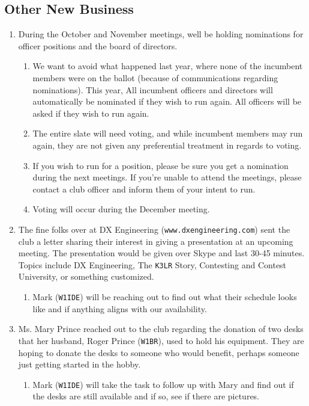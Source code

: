 \documentclass[10pt,letterpaper]{article}
\begin{document}
\subsection{Other New Business}
\begin{enumerate}
  \item During the October and November meetings, well be holding nominations for officer positions and the board of directors.
  \begin{enumerate}
    \item We want to avoid what happened last year, where none of the incumbent members were on the ballot (because of communications regarding nominations). This year, All incumbent officers and directors will automatically be nominated if they wish to run again. All officers will be asked if they wish to run again.
    \item The entire slate will need voting, and while incumbent members may run again, they are not given any preferential treatment in regards to voting.
    \item If you wish to run for a position, please be sure you get a nomination during the next meetings. If you're unable to attend the meetings, please contact a club officer and inform them of your intent to run.
    \item Voting will occur during the December meeting.
  \end{enumerate}
  \item The fine folks over at DX Engineering (\texttt{www.dxengineering.com}) sent the club a letter sharing their interest in giving a presentation at an upcoming meeting. The presentation would be given over Skype and last 30-45 minutes. Topics include DX Engineering, The \texttt{K3LR} Story, Contesting and Contest University, or something customized.
  \begin{enumerate}
    \item Mark (\texttt{W1IDE}) will be reaching out to find out what their schedule looks like and if anything aligns with our availability.
  \end{enumerate}
  \item Ms. Mary Prince reached out to the club regarding the donation of two desks that her husband, Roger Prince (\texttt{W1BR}), used to hold his equipment. They are hoping to donate the desks to someone who would benefit, perhaps someone just getting started in the hobby.
  \begin{enumerate}
    \item Mark (\texttt{W1IDE}) will take the task to follow up with Mary and find out if the desks are still available and if so, see if there are pictures.

\end{enumerate}
\end{enumerate}
\end{document}
